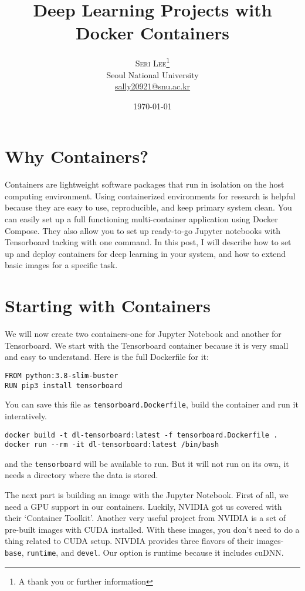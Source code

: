 \documentclass{article}
\title{Deep Learning Projects with Docker Containers} %
\author{%
\textsc{Seri Lee}\thanks{A thank you or further information} \\[1ex] %
\normalsize Seoul National University \\ %
\normalsize \href{mailto:sally20921@snu.ac.kr}{sally20921@snu.ac.kr} %
}
\date{\today} %
\begin{document}
\maketitle

\section{Why Containers?}
Containers are lightweight software packages that run in isolation on the host computing environment.
Using containerized environments for research is helpful because they are easy to use, reproducible, and keep primary system clean.
You can easily set up a full functioning multi-container application using Docker Compose.
They also allow you to set up ready-to-go Jupyter notebooks with Tensorboard tacking with one command.
In this post, I will describe how to set up and deploy containers for deep learning in your system, and how to extend basic images for a specific task.

\section{Starting with Containers}
We will now create two containers-one for Jupyter Notebook and another for Tensorboard.
We start with the Tensorboard container because it is very small and easy to understand.
Here is the full Dockerfile for it:
\begin{verbatim}
FROM python:3.8-slim-buster
RUN pip3 install tensorboard
\end{verbatim}
You can save this file as \texttt{tensorboard.Dockerfile}, build the container 
and run it interatively.
\begin{verbatim}
docker build -t dl-tensorboard:latest -f tensorboard.Dockerfile .
docker run --rm -it dl-tensorboard:latest /bin/bash
\end{verbatim}
and the \texttt{tensorboard} will be available to run.
But it will not run on its own, it needs a directory where the data is stored.

The next part is building an image with the Jupyter Notebook. First of all, we need a GPU support in our containers.
Luckily, NVIDIA got us covered with their `Container Toolkit'. Another very useful project from NVIDIA is a set of pre-built images with CUDA installed.
With these images, you don't need to do a thing related to CUDA setup.
NIVDIA provides three flavors of their images-\texttt{base}, \texttt{runtime}, and \texttt{devel}.
Our option is runtime because it includes cuDNN.
\end{document}
